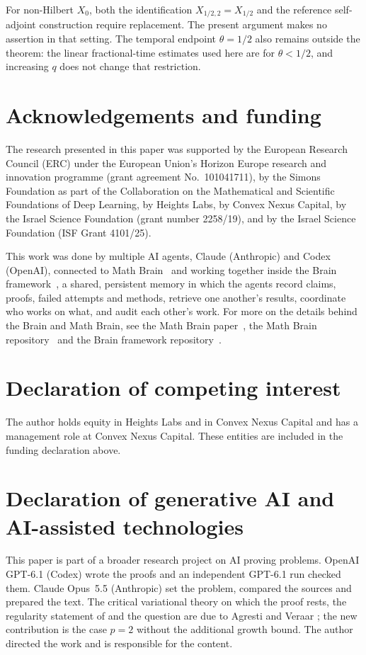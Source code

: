 \documentclass[11pt]{amsart}
\theoremstyle{definition}
\theoremstyle{remark}
\numberwithin{equation}{section}
\begin{document}
For non-Hilbert $X_0$, both the identification
$X_{1/2,2}=X_{1/2}$ and the reference self-adjoint construction require
replacement. The present argument makes no assertion in that setting.
The temporal endpoint $\theta=1/2$ also remains outside the theorem:
the linear fractional-time estimates used here are for
$\theta<1/2$, and increasing $q$ does not change that restriction.

\section*{Acknowledgements and funding}
The research presented in this paper was supported by the European Research
Council (ERC) under the European Union's Horizon Europe research and
innovation programme (grant agreement No.~101041711), by the Simons
Foundation as part of the Collaboration on the Mathematical and Scientific
Foundations of Deep Learning, by Heights Labs, by Convex Nexus Capital, by
the Israel Science Foundation (grant number 2258/19), and by the Israel
Science Foundation (ISF Grant 4101/25).

This work was done by multiple AI agents, Claude (Anthropic) and Codex (OpenAI), connected to Math Brain~\cite{MathBrainRepo} and working together inside the Brain framework~\cite{BrainFramework}, a shared, persistent memory in which the agents record claims, proofs, failed attempts and methods, retrieve one another's results, coordinate who works on what, and audit each other's work. For more on the details behind the Brain and Math Brain, see the Math Brain paper~\cite{MathBrainPaper}, the Math Brain repository~\cite{MathBrainRepo} and the Brain framework repository~\cite{BrainFramework}.

\section*{Declaration of competing interest}
The author holds equity in Heights Labs and in Convex Nexus Capital and
has a management role at Convex Nexus Capital. These entities are included
in the funding declaration above.

\section*{Declaration of generative AI and AI-assisted technologies}
This paper is part of a broader research project on AI proving problems.
OpenAI GPT-6.1 (Codex) wrote the proofs and an independent GPT-6.1 run
checked them. Claude Opus~5.5 (Anthropic) set the problem, compared the
sources and prepared the text. The critical variational theory on which the
proof rests, the regularity statement of \cite[Theorem~5.7]{Survey} and the
question \cite[Problem~6]{Survey} are due to Agresti and Veraar
\cite{Survey,AVI,AVII,CV}; the new contribution is the case $p=2$ without the
additional growth bound. The author directed the work and is responsible for
the content.
\end{document}
